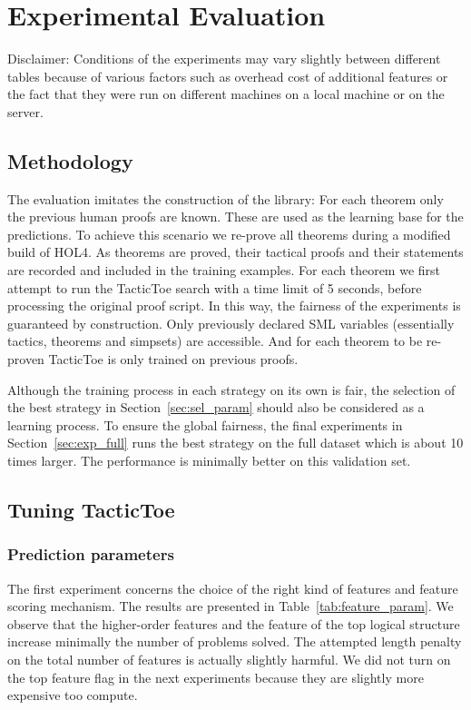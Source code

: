 \documentclass[runningheads,a4paper,draft]{svjour3}
\def\holfour{\textsf{HOL4}\xspace}
\def\sml{\textsf{SML}\xspace}
\def\tactictoe{\textsf{TacticToe}\xspace}
\begin{document}
\section{Experimental Evaluation}\label{s:experiments}

Disclaimer:
Conditions of the experiments may vary slightly between different tables 
because of various factors such 
as overhead cost of additional features or the fact that they were run on 
different machines on a local machine or on the server.

\subsection{Methodology} 

The evaluation imitates the construction of the library: For each theorem only 
the previous human proofs are known. These are used as the learning base for 
the predictions.
To achieve this scenario we re-prove all theorems during a modified build of 
\holfour.
As theorems are proved, their tactical proofs and their statements are recorded 
and included in the 
training examples.
For each theorem we first attempt to run the \tactictoe search with a time 
limit of 5 seconds,
before processing the original proof script.
In this way, the fairness of the
experiments is guaranteed by construction. 
Only previously declared \sml 
variables (essentially tactics, theorems and simpsets) are accessible. 
And for each theorem to be re-proven \tactictoe is only trained on previous 
proofs.

Although the training process in each strategy on its own is fair, the 
selection of the 
best strategy in Section~\ref{sec:sel_param} should also be considered as a 
learning 
process. To ensure the global fairness, the final experiments in 
Section~\ref{sec:exp_full} 
runs the best strategy on the full dataset which is about 10 times larger. The
performance is minimally better on this validation set.


\subsection{Tuning \tactictoe}

\subsubsection{Prediction parameters}
The first experiment concerns the choice of the right kind of features and 
feature scoring 
mechanism. The results are presented in Table~\ref{tab:feature_param}.
We observe that the higher-order features and the feature of the top logical 
structure increase minimally the number of problems solved. The attempted 
length penalty on the total number of features is actually slightly harmful.
We did not turn on the top feature flag in the next experiments because they 
are slightly more expensive too compute.
\end{document}
